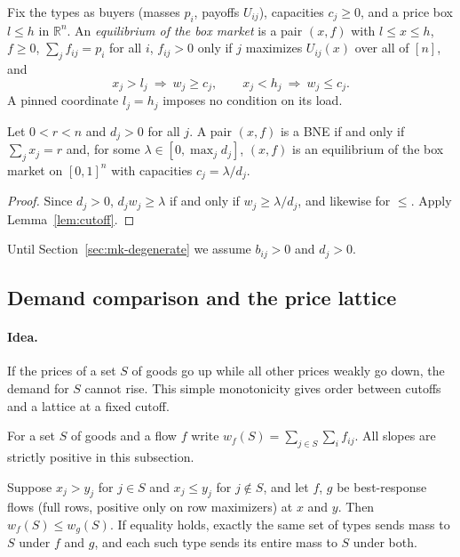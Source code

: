 \begin{definition}\label{def:mk-box}
Fix the types as buyers (masses $p_i$, payoffs $U_{ij}$), capacities $c_j\ge0$, and a price box
$l\le h$ in $\mathbb R^n$. An \emph{equilibrium of the box market} is a pair $(x,f)$ with $l\le x\le h$,
$f\ge0$, $\sum_jf_{ij}=p_i$ for all $i$, $f_{ij}>0$ only if $j$ maximizes $U_{ij}(x)$ over all of $[n]$,
and
\[
x_j>l_j\ \Longrightarrow\ w_j\ge c_j,\qquad x_j<h_j\ \Longrightarrow\ w_j\le c_j .
\]
A pinned coordinate $l_j=h_j$ imposes no condition on its load.
\end{definition}

\begin{lemma}\label{lem:mk-box-cutoff}
Let $0<r<n$ and $d_j>0$ for all $j$. A pair $(x,f)$ is a BNE if and only if $\sum_jx_j=r$ and, for
some $\lambda\in[0,\max_jd_j]$, $(x,f)$ is an equilibrium of the box market on $[0,1]^n$ with
capacities $c_j=\lambda/d_j$.
\end{lemma}

\begin{proof}
Since $d_j>0$, $d_jw_j\ge\lambda$ if and only if $w_j\ge\lambda/d_j$, and likewise for $\le$. Apply
Lemma~\ref{lem:cutoff}.
\end{proof}

Until Section~\ref{sec:mk-degenerate} we assume $b_{ij}>0$ and $d_j>0$.

\subsection{Demand comparison and the price lattice}

\paragraph{Idea.} If the prices of a set $S$ of goods go up while all other prices weakly go down, the
demand for $S$ cannot rise. This simple monotonicity gives order between cutoffs and a lattice at a
fixed cutoff.

For a set $S$ of goods and a flow $f$ write $w_f(S)=\sum_{j\in S}\sum_if_{ij}$. All slopes are
strictly positive in this subsection.

\begin{lemma}\label{lem:mk-demand}
Suppose $x_j>y_j$ for $j\in S$ and $x_j\le y_j$ for $j\notin S$, and let $f$, $g$ be best-response flows
(full rows, positive only on row maximizers) at $x$ and $y$. Then $w_f(S)\le w_g(S)$. If equality holds,
exactly the same set of types sends mass to $S$ under $f$ and $g$, and each such type sends its entire
mass to $S$ under both.
\end{lemma}

